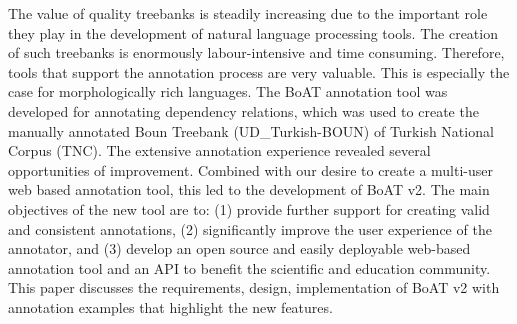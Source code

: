 
The value of quality treebanks is steadily increasing due to the important role they play in the development of natural language processing tools.
The creation of such treebanks is enormously labour-intensive and time consuming. 
Therefore, tools that support the annotation process are very valuable. 
This is especially the case for morphologically rich languages. 
The BoAT annotation tool was developed for annotating dependency relations, which was used to create the manually annotated Boun Treebank (UD_Turkish-BOUN) of Turkish National Corpus (TNC). 
The extensive annotation experience revealed several opportunities of improvement.
Combined with our desire to create a multi-user web based annotation tool, this led to the development of BoAT v2. 
The main objectives of the new tool are to: (1) provide further support for creating valid and consistent annotations, (2) significantly improve the user experience of the annotator, and (3) develop an open source and easily deployable web-based annotation tool and an API to benefit the scientific and education community. 
This paper discusses the requirements, design, implementation of BoAT v2 with annotation examples that highlight the new features. 
